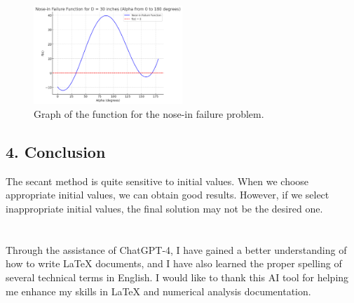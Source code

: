 \documentclass[a4paper]{article}
\begin{document}
\begin{figure}
  \centering
  \includegraphics[width=0.5\textwidth]{./figures/F.png}
  \caption{Graph of the function for the nose-in failure problem.}
  \label{fig:2}
\end{figure}
\subsection*{4. Conclusion}

The secant method is quite sensitive to initial values. When we choose appropriate initial values, we can obtain good results. However, if we select inappropriate initial values, the final solution may not be the desired one.



\section*{  }
Through the assistance of ChatGPT-4, I have gained a better understanding of how to write LaTeX documents, and I have also learned the proper spelling of several technical terms in English. I would like to thank this AI tool for helping me enhance my skills in LaTeX and numerical analysis documentation.
\end{document}
